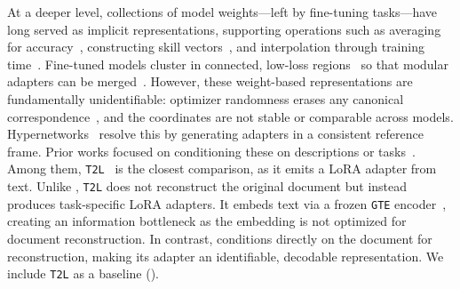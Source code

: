 At a deeper level, collections of model weights---left by fine-tuning tasks---have long served as implicit representations, supporting operations such as averaging for accuracy~\citep{wortsman2022soups}, constructing skill vectors~\citep{ilharco2023task}, and interpolation through training time~\citep{nylund2024time}. Fine-tuned models cluster in connected, low-loss regions~\citep{gueta2023knowledge} so that modular adapters can be merged~\citep{chronopoulou2023adaptersoup,huang2024lorahub,yadav2023ties}. However, these weight-based representations are fundamentally unidentifiable: optimizer randomness erases any canonical correspondence~\citep{garipov2018loss,frankle2020linear,entezari2022permutation,ainsworth2023gitrebasin}, and the coordinates are not stable or comparable across models. Hypernetworks~\citep{ha2017hypernetworks} resolve this by generating adapters in a consistent reference frame. Prior works focused on conditioning these on descriptions or tasks~\citep{ye2021hypter,mahabadi2021hyperformer,phang2023hypertuning,charakorn2025texttolora}. Among them, \texttt{T2L}~\citep{charakorn2025texttolora} is the closest comparison, as it emits a LoRA adapter from text.
Unlike \doctolora, \texttt{T2L} does not reconstruct the original document but instead produces task-specific LoRA adapters. It embeds text via a frozen \texttt{GTE} encoder~\citep{li2023gte}, creating an information bottleneck as the embedding is not optimized for document reconstruction. In contrast, \doctolora conditions directly on the document for reconstruction, making its adapter an identifiable, decodable representation. We include \texttt{T2L} as a baseline ().